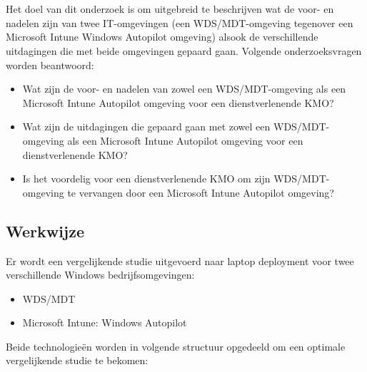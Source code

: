 
\chapter{}
\label{ch:methodologie}


Het doel van dit onderzoek is om uitgebreid te beschrijven wat de voor- en nadelen zijn van twee IT-omgevingen (een WDS/MDT-omgeving tegenover een Microsoft Intune Windows Autopilot omgeving) alsook de verschillende uitdagingen die met beide omgevingen gepaard gaan. Volgende onderzoeksvragen worden beantwoord:

\begin{itemize}
    \item Wat zijn de voor- en nadelen van zowel een WDS/MDT-omgeving als een Microsoft Intune Autopilot omgeving voor een dienstverlenende KMO?
    \item Wat zijn de uitdagingen die gepaard gaan met zowel een WDS/MDT-omgeving als een Microsoft Intune Autopilot omgeving voor een dienstverlenende KMO?
    \item Is het voordelig voor een dienstverlenende KMO om zijn WDS/MDT-omgeving te vervangen door een Microsoft Intune Autopilot omgeving?
\end{itemize}

\section{Werkwijze}
Er wordt een vergelijkende studie uitgevoerd naar laptop deployment voor twee verschillende Windows bedrijfsomgevingen:

\begin{itemize}
    \item WDS/MDT
    \item Microsoft Intune: Windows Autopilot
\end{itemize}

Beide technologieën worden in volgende structuur opgedeeld om een optimale vergelijkende studie te bekomen:

